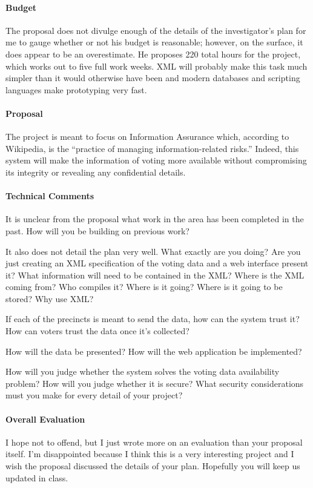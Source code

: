 \documentclass{article}
\begin{document}
\paragraph{Budget}
The proposal does not divulge enough of the details of the investigator's plan for me to gauge whether or not his budget is reasonable; however, on the surface, it does appear to be an overestimate.  He proposes 220 total hours for the project, which works out to five full work weeks.  XML will probably make this task much simpler than it would otherwise have been and modern databases and scripting languages make prototyping very fast.

\paragraph{Proposal}
The project is meant to focus on Information Assurance which, according to Wikipedia, is the ``practice of managing information-related risks.''  Indeed, this system will make the information of voting more available without compromising its integrity or revealing any confidential details.

\paragraph{Technical Comments}
It is unclear from the proposal what work in the area has been completed in the past.  How will you be building on previous work?

It also does not detail the plan very well.  What exactly are you doing?  Are you just creating an XML specification of the voting data and a web interface present it?  What information will need to be contained in the XML?  Where is the XML coming from?  Who compiles it?  Where is it going?  Where is it going to be stored?  Why use XML?

If each of the precincts is meant to send the data, how can the system trust it?  How can voters trust the data once it's collected?

How will the data be presented?  How will the web application be implemented?

How will you judge whether the system solves the voting data availability problem?  How will you judge whether it is secure?  What security considerations must you make for every detail of your project?

\paragraph{Overall Evaluation}
I hope not to offend, but I just wrote more on an evaluation than your proposal itself.  I'm disappointed because I think this is a very interesting project and I wish the proposal discussed the details of your plan.  Hopefully you will keep us updated in class.
\end{document}
